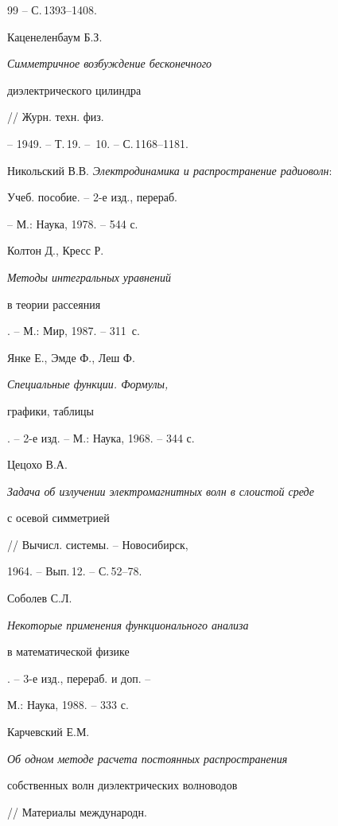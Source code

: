 \begin{thebibliography}{99}
-- С.\,1393--1408.






Каценеленбаум Б.З. {\em Симметричное возбуждение бесконечного 


диэлектрического цилиндра} // Журн. техн. физ. 


-- 1949. -- Т.\,19. -- \No\,10. -- С.\,1168--1181.






Никольский В.В. {\em Электродинамика и распространение радиоволн}:


Учеб. пособие. -- 2-е изд., перераб. 


-- М.: Наука, 1978. -- 544 с.






Колтон Д., Кресс Р. {\em Методы интегральных уравнений


в теории рассеяния}. -- М.: Мир, 1987. -- 311~с.






Янке Е., Эмде Ф., Леш Ф. {\em Специальные функции. Формулы,


графики, таблицы}. -- 2-е изд. -- М.: Наука, 1968. -- 344 с.






Цецохо В.А. {\em Задача об излучении электромагнитных волн в слоистой среде 


с осевой симметрией} // Вычисл. системы. -- Новосибирск,


1964. -- Вып.\,12. -- С.\,52--78.






Соболев С.Л. {\em Некоторые применения функционального анализа


в математической физике}. -- 3-е изд., перераб. и доп. --


М.: Наука, 1988. -- 333 с.






Карчевский Е.М. {\em Об одном методе расчета постоянных распространения


собственных волн диэлектрических волноводов} // Материалы международн.



\end{thebibliography}

